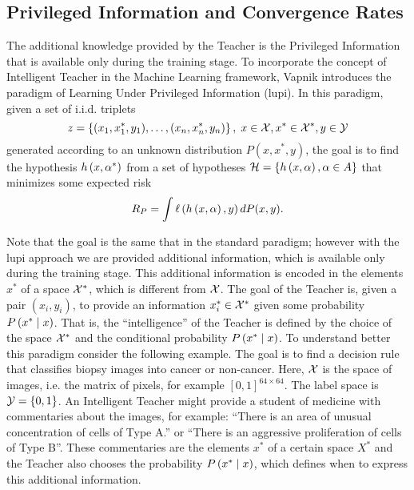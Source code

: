 \subsection{Privileged Information and Convergence Rates}
The additional knowledge provided by the Teacher is the Privileged Information that is available only during the training stage.
To incorporate the concept of Intelligent Teacher in the Machine Learning framework, Vapnik introduces the paradigm of Learning Under Privileged Information (\acrshort{lupi}).
In this paradigm, given a set of i.i.d. triplets
$$ z = \left\{(x_1, x^*_1, y_1), \ldots, (x_n,x^*_n, y_n)\right\}, \; x \in \mathcal{X}, x^* \in \mathcal{X}^*, y \in \mathcal{Y} $$
generated according to an unknown distribution $P(x, x^*, y)$, the goal is to find the hypothesis $h\left(x, \alpha^*\right)$ from a set of hypotheses $\mathcal{H} = \left\{h\left(x, \alpha\right), \alpha \in A\right\}$ that minimizes some expected risk 
$$ R_P = \int \ell\left( h\left(x, \alpha\right), y\right) dP(x, y). $$

Note that the goal is the same that in the standard paradigm; however with the \acrshort{lupi} approach we are provided additional information, which is available only during the training stage. This additional information is encoded in the elements $x^*$ of a space $\mathcal{X}^*$, which is different from $\mathcal{X}$. The goal of the Teacher is, given a pair $(x_i, y_i)$, to provide an information $x_i^* \in \mathcal{X}^*$ given some probability $P\left( x^* \;\middle\vert\; x \right)$. That is, the ``intelligence'' of the Teacher is defined by the choice of the space $\mathcal{X}^*$ and the conditional probability $P\left( x^* \;\middle\vert\; x \right)$. 
To understand better this paradigm consider the following example.
 The goal is to find a decision rule that classifies biopsy images into cancer or non-cancer. Here, $\mathcal{X}$ is the space of images, i.e. the matrix of pixels, for example $[0, 1]^{64 \times 64}$. The label space is $\mathcal{Y} = \left\{0, 1\right\}$. An Intelligent Teacher might provide a student of medicine with commentaries about the images, for example: ``There is an area of unusual concentration of cells of Type A.'' or ``There is an aggressive proliferation of cells of Type B''. These commentaries are the elements $x^*$ of a certain space $X^*$ and the Teacher also chooses the probability $P\left( x^* \;\middle\vert\; x \right)$, which defines when to express this additional information.

